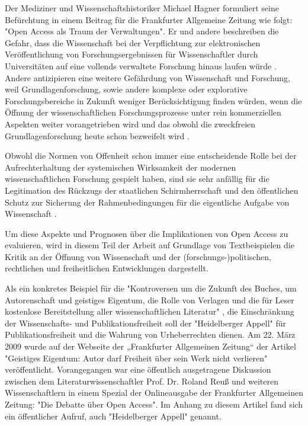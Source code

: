 Der Mediziner und Wissenschaftshistoriker Michael Hagner formuliert seine Befürchtung in einem Beitrag für die Frankfurter Allgemeine Zeitung wie folgt: "Open Access als Traum der Verwaltungen". Er und andere beschreiben die Gefahr, dass die Wissenschaft bei der Verpflichtung zur elektronischen Veröffentlichung von Forschungsergebnissen für Wissenschaftler durch Universitäten auf eine vollends verwaltete Forschung hinaus laufen würde \cite{hagner_faz_2009}. Andere antizipieren eine weitere Gefährdung von Wissenschaft und Forschung, weil Grundlagenforschung, sowie andere komplexe oder explorative Forschungsbereiche in Zukunft weniger Berücksichtigung finden würden, wenn die Öffnung der wissenschaftlichen Forschungsprozesse unter rein kommerziellen Aspekten weiter vorangetrieben wird \cite{suchen} und das obwohl die  zweckfreien Grundlagenforschung heute schon bezweifelt wird \cite{suchen}.

Obwohl die Normen von Offenheit schon immer eine entscheidende Rolle bei der Aufrechterhaltung der systemischen Wirksamkeit der modernen wissenschaftlichen Forschung gespielt haben, sind sie sehr anfällig für die Legitimation des Rückzugs der staatlichen Schirmherrschaft und den öffentlichen Schutz zur Sicherung der Rahmenbedingungen für die eigentliche Aufgabe von Wissenschaft \cite{david1998_common}.

Um diese Aspekte und Prognosen über die Implikationen von Open Access zu evaluieren, wird in diesem Teil der Arbeit auf Grundlage von Textbeispielen die Kritik an der Öffnung von Wissenschaft und der (forschungs-)politischen, rechtlichen und freiheitlichen Entwicklungen dargestellt.

Als ein konkretes Beispiel für die "Kontroversen um die Zukunft des Buches, um Autorenschaft und geistiges Eigentum, die Rolle von Verlagen und die für Leser kostenlose Bereitstellung aller wissenschaftlichen Literatur" \cite{hagner_2015_sache_buches}, die Einschränkung der Wissenschafts- und Publikationsfreiheit soll der "Heidelberger Appell" für Publikationsfreiheit und die Wahrung von Urheberrechten dienen. Am 22. März 2009 wurde auf der Webseite der „Frankfurter Allgemeinen Zeitung“ der Artikel "Geistiges Eigentum: Autor darf Freiheit über sein Werk nicht verlieren" \cite{faz_heidelberger_apell_2009} veröffentlicht. Vorangegangen war eine öffentlich ausgetragene Diskussion zwischen dem Literaturwissenschaftler Prof. Dr. Roland Reuß und weiteren Wissenschaftlern in einem Spezial der Onlineausgabe der Frankfurter Allgemeinen Zeitung: "Die Debatte über Open Access". Im Anhang zu diesem Artikel fand sich ein öffentlicher Aufruf, auch "Heidelberger Appell" genannt.

